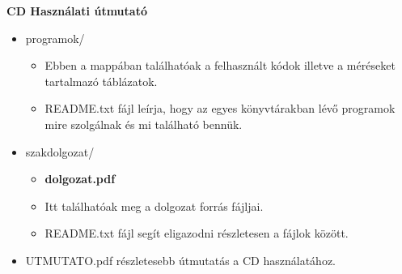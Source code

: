 \pagestyle{empty}

\noindent \textbf{\Large CD Használati útmutató}

\vskip 1cm

\begin{itemize}
	\item programok/
		\begin{itemize}
			\item Ebben a mappában találhatóak a felhasznált kódok illetve a méréseket tartalmazó táblázatok.
			\item README.txt fájl leírja, hogy az egyes könyvtárakban lévő programok mire szolgálnak és mi található bennük.
		\end{itemize}
	\item szakdolgozat/
			\begin{itemize}
				\item \textbf{dolgozat.pdf}
				\item Itt találhatóak meg a dolgozat forrás fájljai.
				\item README.txt fájl segít eligazodni részletesen a fájlok között.
		\end{itemize}
		
	\item UTMUTATO.pdf részletesebb útmutatás a CD használatához.
\end{itemize}


%
